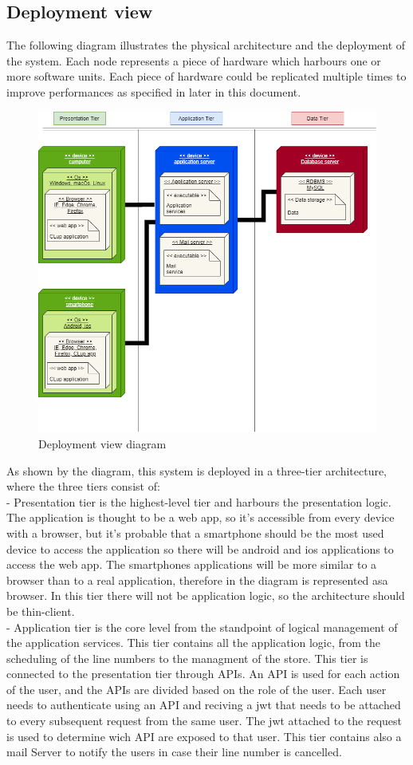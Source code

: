 \subsection{Deployment view}
The following diagram illustrates the physical architecture and the
deployment of the system.
Each node represents a piece of hardware which harbours one or more software units.
Each piece of hardware could be replicated multiple times to improve performances as specified in later in this document.

\begin{figure}[H]
    \centering
    \hspace*{-3.5cm}
    \includegraphics[height=0.7\textwidth]{Images/TierDiagram.png}
    \caption{Deployment view diagram}
\end{figure}

As shown by the diagram, this system is deployed in a three-tier
architecture, where the three tiers consist of: \\
- Presentation tier is the highest-level tier and harbours the presentation logic.
The application is thought to be a web app, so it's accessible from every device with a browser, but it's probable that
a smartphone should be the most used device to access the application so there will be android and ios applications to access
the web app.
The smartphones applications will be more similar to a browser than to a real application, therefore in the diagram is represented asa browser.
In this tier there will not be application logic, so the architecture should be thin-client.\\
- Application tier is the core level from the standpoint of logical management of the application services.
This tier contains all the application logic, from the scheduling of the line numbers to the managment of the store.
This tier is connected to the presentation tier through APIs.
An API is used for each action of the user, and the APIs are divided based on the role of the user.
Each user needs to authenticate using an API and reciving a jwt that needs to be attached to every subsequent request from the same user.
The jwt attached to the request is used to determine wich API are exposed to that user.
This tier contains also a mail Server to notify the users in case their line number is cancelled. \\

